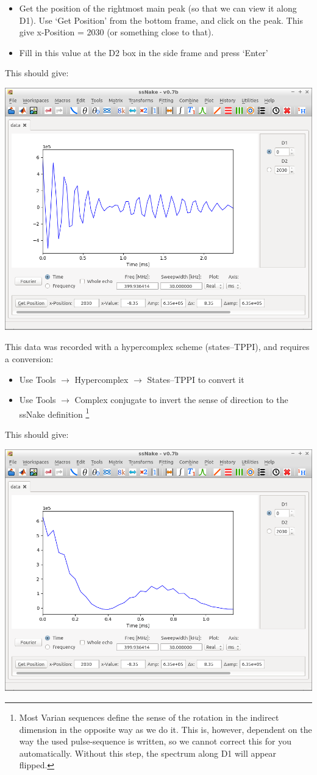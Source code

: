 \documentclass[11pt,a4paper]{article}
\begin{document}
\begin{itemize}
  \item Get the position of the rightmost main peak (so that we can view it along D1). Use `Get
	 Position' from the bottom frame, and click on the peak. This give x-Position = 2030 (or
	 something close to that).
  \item Fill in this value at the D2 box in the side frame and press `Enter'
\end{itemize}
This should give:
\begin{center}
\includegraphics[width=0.7\linewidth]{Figs/Fig3.png}
\end{center}
This data was recorded with a hypercomplex scheme (states--TPPI), and requires a conversion:

\begin{itemize}
  \item Use Tools $\longrightarrow$ Hypercomplex $\longrightarrow$ States--TPPI to convert it
	\item Use Tools $\longrightarrow$ Complex conjugate to invert the sense of direction to the
	  ssNake definition \footnote{Most Varian sequences define the sense of the rotation in the
	  indirect dimension in the opposite way as we do it. This is, however, dependent on the way the
	used pulse-sequence is written, so we cannot correct this for you automatically. Without this
 step, the spectrum along D1 will appear flipped. }
\end{itemize}
This should give:
\begin{center}
\includegraphics[width=0.7\linewidth]{Figs/Fig4.png}
\end{center}
\end{document}
